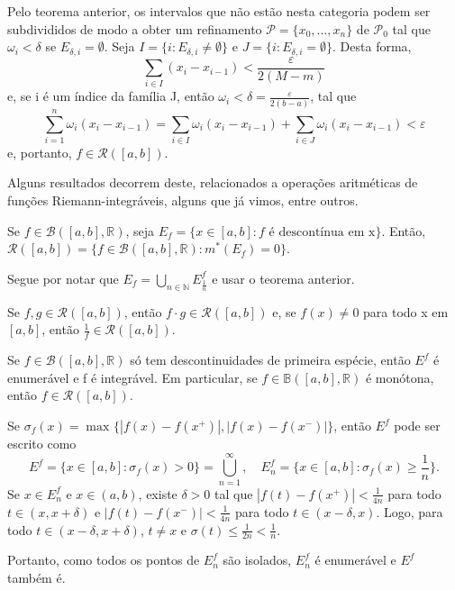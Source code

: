 \documentclass[../analysis_notes.tex]{subfiles}
\begin{document}
\begin{proof*}
	Pelo teorema anterior, os intervalos que não estão nesta categoria podem ser subdivididos de modo a obter um refinamento \(\mathcal{P}=\{x_{0}, \dotsc , x_{n}\}\) de \(\mathcal{P}_{0}\) tal que \(\omega_{i}<\delta  \) se \(E_{\delta , i}= \emptyset \). Seja \(I=\{i:E_{\delta, i}\neq\emptyset\}\) e \(J=\{i:E_{\delta , i}=\emptyset \}\). Desta forma,
	\[
		\sum\limits_{i\in I}^{}(x_{i}-x_{i-1})<\frac{\varepsilon }{2(M-m)}
	\]
	e, se i é um índice da família J, então \(\omega_{i}<\delta =\frac{\varepsilon }{2(b-a)}\), tal que
	\[
		\sum\limits_{i=1}^{n}\omega_{i}(x_{i}-x_{i-1})=\sum\limits_{i\in I}^{}\omega_{i}(x_{i}-x_{i-1})+\sum\limits_{i\in J}^{}\omega_{i}(x_{i}-x_{i-1})<\varepsilon
	\]
	e, portanto, \(f\in \mathcal{R}([a, b])\). \qedsymbol
\end{proof*}
Alguns resultados decorrem deste, relacionados a operações aritméticas de funções Riemann-integráveis, alguns que já vimos, entre outros.
\begin{crl*}
	Se \(f\in \mathcal{B}([a, b], \mathbb{R})\), seja \(E_{f}=\{x\in [a, b]: f \text{ é descontínua em x}\}\). Então, \(\mathcal{R}([a, b])=\{f\in \mathcal{B}([a, b], \mathbb{R}): m^{*}(E_{f})=0\}\).
\end{crl*}
\begin{proof*}
	Segue por notar que \(E_{f}=\bigcup_{n\in \mathbb{N}}^{}E_{\frac{1}{n}}^{f}\) e usar o teorema anterior. \qedsymbol
\end{proof*}
\begin{crl*}
	Se \(f, g\in \mathcal{R}([a, b])\), então \(f \cdot g\in \mathcal{R}([a, b])\) e, se \(f(x)\neq 0\) para todo x em \([a, b]\), então \(\frac{1}{f}\in \mathcal{R}([a, b])\).
\end{crl*}
\begin{crl*}
	Se \(f\in \mathcal{B}([a, b], \mathbb{R})\) só tem descontinuidades de primeira espécie, então \(E^{f}\) é enumerável e f é integrável. Em particular, se \(f\in \mathbb{B}([a, b], \mathbb{R})\) é monótona, então \(f\in \mathcal{R}([a, b])\).
\end{crl*}
\begin{proof*}
	Se \(\sigma_{f}(x)=\max_{}\{|f(x)-f(x^{+})|, |f(x)-f(x^{-})|\}\), então \(E^{f}\) pode ser escrito como
	\[
		E^{f}=\{x\in[a, b]: \sigma_{f}(x)>0\} = \bigcup_{n=1}^{\infty},\quad E_{n}^{f}=\biggl\{x\in[a, b]:\sigma_{f}(x)\geq \frac{1}{n}\biggr\}.
	\]
	Se \(x\in E_{n}^{f}\) e \(x\in(a, b)\), existe \(\delta >0\) tal que \(|f(t)-f(x^{+})|<\frac{1}{4n}\) para todo \(t\in(x, x+\delta )\) e \(|f(t)-f(x^{-})|<\frac{1}{4n}\) para todo \(t\in(x-\delta , x).\) Logo, para todo \(t\in (x-\delta, x+\delta )\), \(t\neq x\) e \(\sigma(t)\leq \frac{1}{2n}<\frac{1}{n}.\)

	Portanto, como todos os pontos de \(E_{n}^{f}\) são isolados, \(E_{n}^{f}\) é enumerável e \(E^{f}\) também é. \qedsymbol
\end{proof*}
\end{document}

